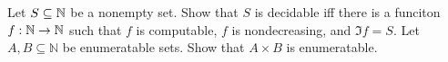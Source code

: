 \begin{chapterendexercises}
  \exercise Let $S \subseteq \mathbb{N}$ be a nonempty set.
    Show that $S$ is decidable iff there is a funciton $f : \mathbb{N} \to \mathbb{N}$ such
    that $f$ is computable, $f$ is nondecreasing, and $\Im{f} = S$.
  \exercise Let $A, B \subseteq \mathbb{N}$ be enumeratable sets. Show that
    $A \times B$ is enumeratable.
\end{chapterendexercises}
